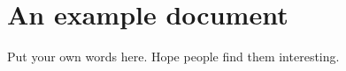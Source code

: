 



\section*{An example \latex document}

Put your own words here. Hope people find them interesting.


